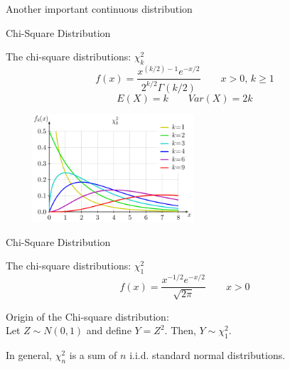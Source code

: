 \documentclass{beamer}\usepackage[]{graphicx}\usepackage[]{color}
\begin{document}
\begin{frame}

\begin{center}
\huge{Another important continuous distribution }
\end{center}
\end{frame}

\begin{frame}{Chi-Square Distribution}

The chi-square distributions: $\chi_k^2$
$$f(x) = \frac{ x^{(k/2)-1} e^{- x/2}}{2^{k/2}\Gamma(k/2)}
  \qquad x>0,\, k\geq 1$$ \pause
$$E(X) = k \qquad Var(X) = 2k$$ \pause

\begin{center}
\includegraphics[width=8cm,height=4cm]{chi-square}
\end{center}


\end{frame}

\begin{frame}{Chi-Square Distribution}

The chi-square distributions: $\chi_1^2$
$$f(x) = \frac{ x^{-1/2} e^{- x/2}}{\sqrt{2\pi}}
  \qquad x>0$$ \pause
  
Origin of the Chi-square distribution: \\
Let $Z\sim N(0,1)$ and define $Y=Z^2.$  Then, $Y\sim \chi^2_1.$ \pause
\bigskip



\bigskip
In general, $\chi_n^2$ is a sum of $n$ i.i.d. standard normal distributions.

  \end{frame}
\end{document}
